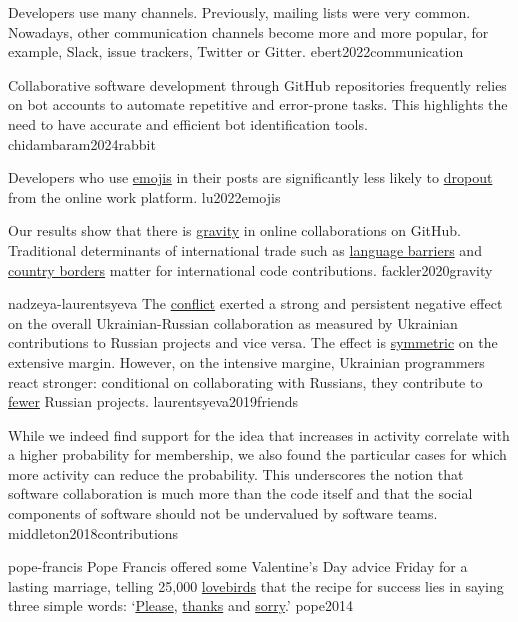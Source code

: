 \documentclass{article}
\begin{document}
  {Developers use many channels. Previously, mailing lists were very common. Nowadays, other communication channels become more and more popular, for example, Slack, issue trackers, Twitter or Gitter.}
  {ebert2022communication}


  {Collaborative software development through GitHub repositories frequently relies on bot accounts to automate repetitive and error-prone tasks. This highlights the need to have accurate and efficient bot identification tools.}
  {chidambaram2024rabbit}


  {Developers who use \ul{emojis} in their posts are significantly less likely to \ul{dropout} from the online work platform.}
  {lu2022emojis}

  {Our results show that there is \ul{gravity} in online collaborations on GitHub. Traditional determinants of international trade such as \ul{language barriers} and \ul{country borders} matter for international code contributions.}
  {fackler2020gravity}

\qte
  {nadzeya-laurentsyeva}
  {The \ul{conflict} exerted a strong and persistent negative effect on the overall
  Ukrainian-Russian collaboration as measured by Ukrainian contributions
  to Russian projects and vice versa. The effect is \ul{symmetric} on the extensive margin.
  However, on the intensive margine, Ukrainian programmers react stronger: conditional
  on collaborating with Russians, they contribute to \ul{fewer} Russian projects.}
  {laurentsyeva2019friends}

  {While we indeed find support for the idea that increases in activity correlate with a higher probability for membership, we also found the particular cases for which more activity can reduce the probability. This underscores the notion that software collaboration is much more than the code itself and that the social components of software should not be undervalued by software teams.}
  {middleton2018contributions}

\qte
  {pope-francis}
  {Pope Francis offered some Valentine’s Day advice Friday for a lasting marriage, telling 25,000 \ul{lovebirds} that the recipe for success lies in saying three simple words: `\ul{Please}, \ul{thanks} and \ul{sorry}.'{}}
  {pope2014}
\end{document}
